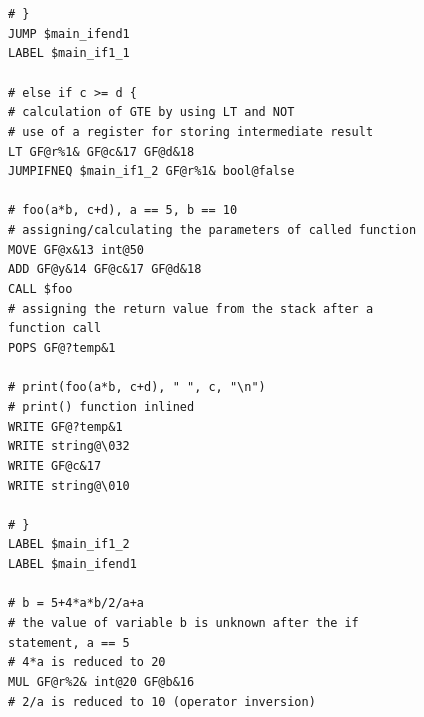 \documentclass[12pt]{article}
\begin{document}
\begin{figure}
\texttt{\textcolor{comment}{\# \}}\\
JUMP \$main\_ifend1\\
LABEL \$main\_if1\_1\\
\\
\textcolor{comment}{\# else if c >= d \{}\\
\textcolor{comment}{\# calculation of GTE by using LT and NOT}\\
\textcolor{comment}{\# use of a register for storing intermediate result}\\
LT GF@r\%1\& GF@c\&17 GF@d\&18\\
JUMPIFNEQ \$main\_if1\_2 GF@r\%1\& bool@false\\
\\
\textcolor{comment}{\# foo(a\**b, c+d), a == 5, b == 10}\\
\textcolor{comment}{\# assigning/calculating the parameters of called function}\\
MOVE GF@x\&13 int@50\\
ADD GF@y\&14 GF@c\&17 GF@d\&18\\
CALL \$foo\\
\textcolor{comment}{\# assigning the return value from the stack after a function call}\\
POPS GF@?temp\&1\\
\\
\textcolor{comment}{\# print(foo(a\**b, c+d), " ", c, "\textbackslash n")}\\
\textcolor{comment}{\# print() function inlined}\\
WRITE GF@?temp\&1\\
WRITE string@\textbackslash 032\\
WRITE GF@c\&17\\
WRITE string@\textbackslash 010\\
\\
\textcolor{comment}{\# \}}\\
LABEL \$main\_if1\_2\\
LABEL \$main\_ifend1\\
\\
\textcolor{comment}{\# b = 5+4\**a\**b/2/a+a}\\
\textcolor{comment}{\# the value of variable b is unknown after the if statement, a == 5}\\
\textcolor{comment}{\# 4\**a is reduced to 20}\\
MUL GF@r\%2\& int@20 GF@b\&16\\
\textcolor{comment}{\# 2/a is reduced to 10 (operator inversion)}\\
}
\end{figure}
\end{document}

